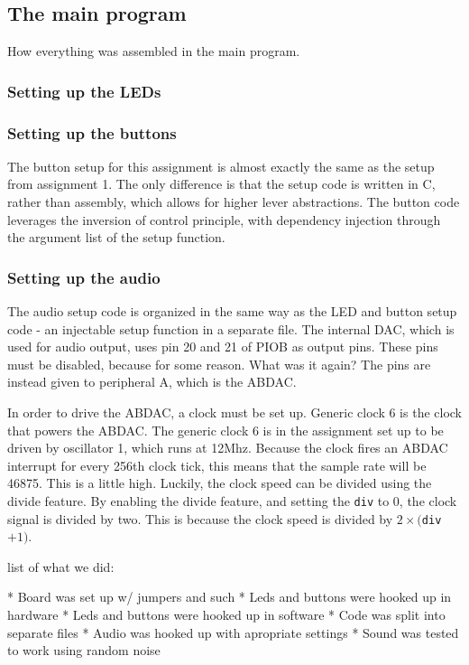 \subsection{The main program}

How everything was assembled in the main program.

\subsubsection{Setting up the LEDs}
\subsubsection{Setting up the buttons}

The button setup for this assignment is almost exactly the same as the setup from assignment 1.\cite{tdt4258-1}
The only difference is that the setup code is written in C, rather than assembly, which allows for higher lever abstractions.
The button code leverages the inversion of control principle, with dependency injection through the argument list of the setup function.

\subsubsection{Setting up the audio}

The audio setup code is organized in the same way as the LED and button setup code - an injectable setup function in a separate file.
The internal DAC, which is used for audio output, uses pin 20 and 21 of PIOB as output pins.
These pins must be disabled, because for some reason. What was it again?
The pins are instead given to peripheral A, which is the ABDAC.

In order to drive the ABDAC, a clock must be set up.
Generic clock 6 is the clock that powers the ABDAC.
The generic clock 6 is in the assignment set up to be driven by oscillator 1, which runs at 12Mhz.
Because the clock fires an ABDAC interrupt for every 256th clock tick, this means that the sample rate will be 46875.
This is a little high.
Luckily, the clock speed can be divided using the divide feature.
By enabling the divide feature, and setting the \texttt{div} to 0, the clock signal is divided by two.
This is because the clock speed is divided by $2\times($\texttt{div}$+1)$.


list of what we did:

* Board was set up w/ jumpers and such
* Leds and buttons were hooked up in hardware
* Leds and buttons were hooked up in software
* Code was split into separate files
* Audio was hooked up with apropriate settings
* Sound was tested to work using random noise



